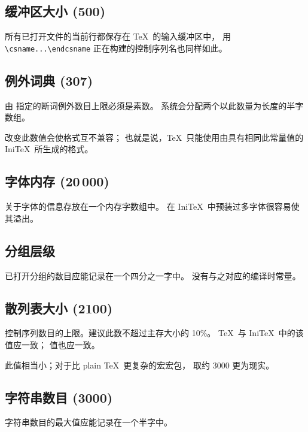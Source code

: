 \documentclass[a4paper]{rapport3}
\def\IniTeX{Ini\TeX}\def\LamsTeX{LAMS\TeX}\def\VirTeX{Vir\TeX}
\begin{document}
\subsection{缓冲区大小 {\rm(500)}}

所有已打开文件的当前行都保存在 \TeX\ 的输入缓冲区中，
用 \verb-\csname...\endcsname- 正在构建的控制序列名也同样如此。

\subsection{例外词典 {\rm(307)}}

由  指定的断词例外数目上限必须是素数。
系统会分配两个以此数量为长度的半字数组。

改变此数值会使格式互不兼容；
也就是说，\TeX\ 只能使用由具有相同此常量值的 \IniTeX\ 所生成的格式。

\subsection{字体内存 (20$\,$000)}

关于字体的信息存放在一个内存字数组中。
在 \IniTeX\ 中预装过多字体很容易使其溢出。

\subsection{分组层级}

已打开分组的数目应能记录在一个四分之一字中。
没有与之对应的编译时常量。

\subsection{散列表大小 {\rm(2100)}}

控制序列数目的上限。建议此数不超过主存大小的 10\%。
\TeX\ 与 \IniTeX\ 中的该值应一致； 值也应一致。

此值相当小；对于比 plain \TeX\ 更复杂的宏宏包，
取约 3000 更为现实。

\subsection{字符串数目 {\rm(3000)}}

字符串数目的最大值应能记录在一个半字中。

\end{document}
